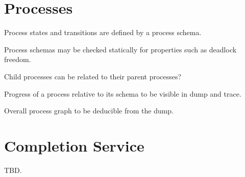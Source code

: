 \documentclass[a4paper]{article}
\begin{document}
\section{Processes}

Process states and transitions are defined by a process schema.

Process schemas may be checked statically for properties such as deadlock freedom.

Child processes can be related to their parent processes?

Progress of a process relative to its schema to be visible in dump and trace.

Overall process graph to be deducible from the dump.

\clearpage
\section{Completion Service}

TBD.
\end{document}
